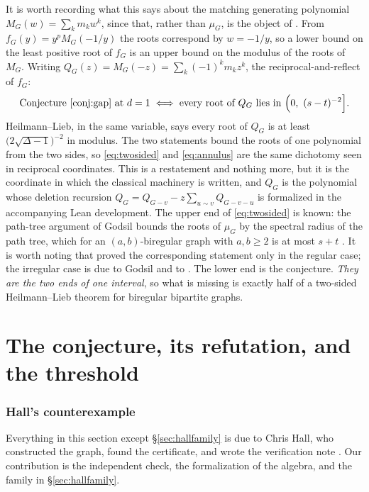 \documentclass[11pt]{article}
\theoremstyle{remark}
\begin{document}
It is worth recording what this says about the matching generating polynomial
$M_G(w)=\sum_km_kw^k$, since that, rather than $\mu_G$, is the object of
\cite{HL}. From $f_G(y)=y^pM_G(-1/y)$ the roots correspond by $w=-1/y$, so a
lower bound on the least positive root of $f_G$ is an upper bound on the modulus
of the roots of $M_G$. Writing $Q_G(z)=M_G(-z)=\sum_k(-1)^km_kz^k$, the
reciprocal-and-reflect of $f_G$:
\begin{equation}\label{eq:annulus}
\text{Conjecture~\ref{conj:gap} at }d=1
\iff
\text{every root of }Q_G\text{ lies in }\Bigl(0,\ (s-t)^{-2}\Bigr].
\end{equation}
Heilmann--Lieb, in the same variable, says every root of $Q_G$ is at least
$\bigl(2\sqrt{\Delta-1}\bigr)^{-2}$ in modulus. The two statements bound the
roots of one polynomial from the two sides, so \eqref{eq:twosided} and
\eqref{eq:annulus} are the same dichotomy seen in reciprocal coordinates. This
is a restatement and nothing more, but it is the coordinate in which the
classical machinery is written, and $Q_G$ is the polynomial whose deletion
recursion $Q_G=Q_{G-v}-z\sum_{u\sim v}Q_{G-v-u}$ is formalized in the
accompanying Lean development. The upper end of
\eqref{eq:twosided} is known: the path-tree argument of Godsil bounds the roots
of $\mu_G$ by the spectral radius of the path tree, which for an
$(a,b)$-biregular graph with $a,b\ge2$ is at most $s+t$
\cite{God81,God93}. It is worth
noting that \cite{HL} proved the corresponding statement only in the regular
case; the irregular case is due to Godsil and to \cite{MSS}. The lower end is
the conjecture. \emph{They are the two ends of one interval}, so
what is missing is exactly half of a two-sided Heilmann--Lieb theorem for
biregular bipartite graphs.

\part{The conjecture, its refutation, and the threshold}

\section{Hall's counterexample}\label{sec:hallce}

Everything in this section except \S\ref{sec:hallfamily} is due to Chris Hall, who
constructed the graph, found the certificate, and wrote the verification note
\cite{HallCE}. Our contribution is the independent check, the formalization of the
algebra, and the family in \S\ref{sec:hallfamily}.
\end{document}
